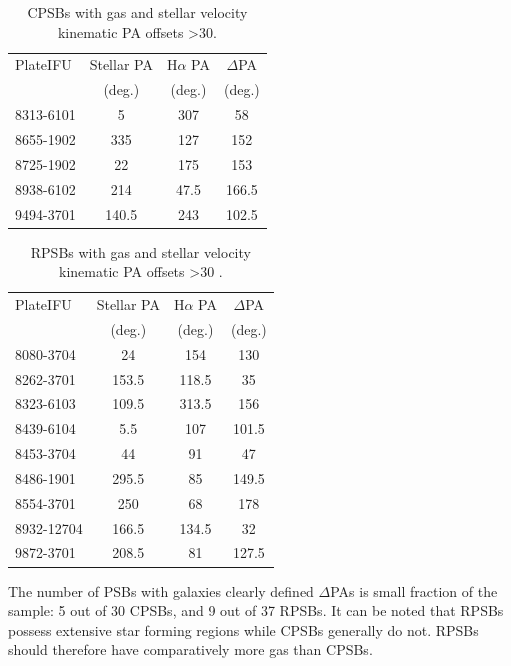 \begin{table}[h]
\centering
\caption{CPSBs with gas and stellar velocity kinematic PA offsets \textgreater 30\textdegree.}
\label{tab:offsetCPSBs}
\begin{tabular}{lccc}
\hline
PlateIFU  & Stellar PA & H$\alpha$ PA & $\Delta$PA \\
  & (deg.) & (deg.) & (deg.) \\
\hline
8313-6101 & 5 & 307 & 58 \\
8655-1902 & 335 & 127 & 152 \\
8725-1902 & 22 & 175 & 153 \\
8938-6102 & 214 & 47.5 & 166.5 \\
9494-3701 & 140.5 & 243 & 102.5 \\
\hline
\end{tabular}
\end{table}

\begin{table}[h]
\centering
\caption{RPSBs with gas and stellar velocity kinematic PA offsets \textgreater 30 \textdegree.}
\label{tab:offsetRPSBs}
\begin{tabular}{lccc}
\hline
PlateIFU   & Stellar PA & H$\alpha$ PA & $\Delta$PA \\
  & (deg.) & (deg.) & (deg.) \\
\hline
8080-3704 & 24 & 154 & 130 \\
8262-3701 & 153.5 & 118.5 & 35 \\
8323-6103 & 109.5 & 313.5 & 156 \\
8439-6104 & 5.5 & 107 & 101.5 \\
8453-3704 & 44 & 91 & 47 \\
8486-1901 & 295.5 & 85 & 149.5 \\
8554-3701 & 250 & 68 & 178 \\
8932-12704 & 166.5 & 134.5 & 32 \\
9872-3701 & 208.5 & 81 & 127.5 \\
\hline
\end{tabular}
\end{table}

The number of PSBs with galaxies clearly defined $\Delta$PAs is small fraction of the sample: 5 out of 30 CPSBs, and 9 out of 37 RPSBs. It can be noted that RPSBs possess extensive star forming regions while CPSBs generally do not. RPSBs should therefore have comparatively more gas than CPSBs.
